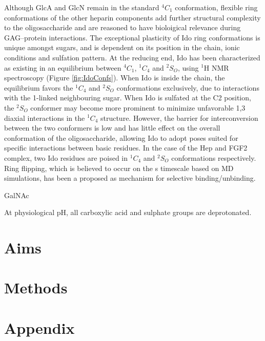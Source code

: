 \documentclass[journal=jctcce,manuscript=article]{achemso}
\begin{document}
{Although \ac{GlcA} and \ac{GlcN} remain in the standard $^{4}C_{1}$ conformation, flexible ring conformations of the other heparin components add further structural complexity to the oligosaccharide and are reasoned to have bioloigical relevance during \ac{GAG}--protein interactions.\cite{Sattelle2013DoesHeparanome} 
The exceptional plasticity of \ac{Ido} ring conformations is unique amongst sugars, and is dependent on its position in the chain, ionic conditions and sulfation pattern.\cite{Capila2002Heparin-proteinInteractions., vanBoeckel1987ConformationalAcid}
At the reducing end, \ac{Ido} has been characterized as existing in an equilibrium between $^{4}C_{1}$, $^{1}C_{4}$ and $^{2}S_{O}$, using $^{1}$H NMR spectroscopy (Figure \ref{fig:IdoConfs}).\cite{Ferro1986EvidenceStudies, vanBoeckel1987ConformationalAcid} 
When \ac{Ido} is inside the chain, the equilibrium favors the $^{1}C_{4}$ and $^{2}S_{O}$ conformations exclusively, due to interactions with the 1-linked neighbouring sugar.\cite{vanBoeckel1987ConformationalAcid} 
When \ac{Ido} is sulfated at the C2 position, the $^{2}S_{O}$ conformer may become more prominent to minimize unfavorable 1,3 diaxial interactions in the $^{1}C_{4}$ structure.\cite{Hsieh2016UncoveringSulphateb} However, the barrier for interconversion between the two conformers is low and has little effect on the overall conformation of the oligosaccharide, allowing \ac{Ido} to adopt poses suited for specific interactions between basic residues. \cite{Capila2002Heparin-proteinInteractions.} In the case of the \ac{Hep} and \ac{FGF2} complex, two \ac{Ido} residues are poised in $^{1}C_{4}$ and $^{2}S_{O}$ conformations respectively.\cite{Faham1996HeparinFactor} Ring flipping, which is believed to occur on the \textmu s timescale based on \ac{MD} simulations, has been a proposed as mechanism for selective binding/unbinding. \cite{Sattelle2012DependenceIdopyranosides} 

\Ac{GalNAc}

At physiological pH, all carboxylic acid and sulphate groups are deprotonated. 




\pagebreak
\section{Aims}

\section{Methods}


}
\newpage
{

}
\newpage
\section{Appendix}
\end{document}
